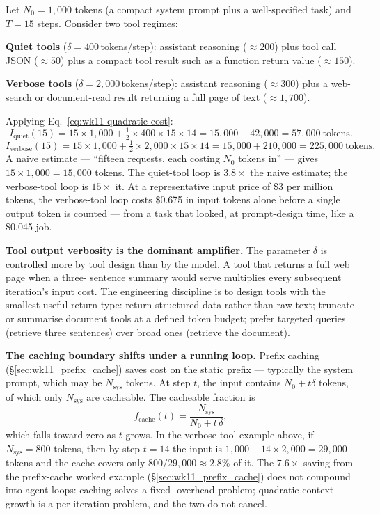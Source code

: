 \begin{workedexample}
Let $N_0 = 1{,}000$ tokens (a compact system prompt plus a
well-specified task) and $T = 15$ steps. Consider two tool
regimes:

\textbf{Quiet tools} ($\delta = 400$\,tokens/step): assistant
reasoning ($\approx 200$) plus tool call JSON ($\approx 50$)
plus a compact tool result such as a function return value
($\approx 150$).

\textbf{Verbose tools} ($\delta = 2{,}000$\,tokens/step):
assistant reasoning ($\approx 300$) plus a web-search or
document-read result returning a full page of text ($\approx
1{,}700$).

Applying Eq.~\eqref{eq:wk11-quadratic-cost}:
\[
  I_\text{quiet}(15) = 15 \times 1{,}000
                     + \tfrac{1}{2}\times 400\times 15\times 14
                     = 15{,}000 + 42{,}000 = 57{,}000\ \text{tokens}.
\]
\[
  I_\text{verbose}(15) = 15 \times 1{,}000
                       + \tfrac{1}{2}\times 2{,}000\times 15\times 14
                       = 15{,}000 + 210{,}000 = 225{,}000\ \text{tokens}.
\]
A naive estimate --- ``fifteen requests, each costing $N_0$
tokens in'' --- gives $15 \times 1{,}000 = 15{,}000$ tokens.
The quiet-tool loop is $3.8\times$ the naive estimate; the
verbose-tool loop is $15\times$ it. At a representative
input price of \$3 per million tokens, the verbose-tool loop
costs \$0.675 in input tokens alone before a single output
token is counted --- from a task that looked, at prompt-design
time, like a \$0.045 job.
\end{workedexample}

\textbf{Tool output verbosity is the dominant amplifier.} The
parameter $\delta$ is controlled more by tool design than by
the model. A tool that returns a full web page when a three-
sentence summary would serve multiplies every subsequent
iteration's input cost. The engineering discipline is to
design tools with the smallest useful return type: return
structured data rather than raw text; truncate or summarise
document tools at a defined token budget; prefer targeted
queries (retrieve three sentences) over broad ones (retrieve
the document).

\textbf{The caching boundary shifts under a running loop.}
Prefix caching (\S\ref{sec:wk11_prefix_cache}) saves cost on
the static prefix --- typically the system prompt, which may
be $N_\text{sys}$ tokens. At step $t$, the input contains
$N_0 + t\delta$ tokens, of which only $N_\text{sys}$ are
cacheable. The cacheable fraction is
\[
  f_\text{cache}(t) = \frac{N_\text{sys}}{N_0 + t\,\delta},
\]
which falls toward zero as $t$ grows. In the verbose-tool
example above, if $N_\text{sys} = 800$ tokens, then by
step $t = 14$ the input is $1{,}000 + 14 \times 2{,}000 =
29{,}000$ tokens and the cache covers only $800 / 29{,}000
\approx 2.8\%$ of it. The $7.6\times$ saving from the
prefix-cache worked example (\S\ref{sec:wk11_prefix_cache})
does not compound into agent loops: caching solves a fixed-
overhead problem; quadratic context growth is a per-iteration
problem, and the two do not cancel.

